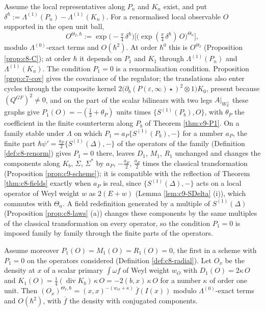 \begin{definition}
\label{def:c8-radial}
Assume the local representatives along $P_n$ and $K_n$ exist, and put $\delta^\hbar:=\Lambda^{(1)}(P_n)-\Lambda^{(1)}(K_n)$. For a renormalised local observable $O$ supported in the open unit ball,
\[
O^{\Theta_I,\hbar}:=\exp\big(-\tfrac\pi4\,\delta^\hbar\big)\Big[\big(\exp(\tfrac\pi4\,\delta^\hbar)\,O\big)^{\Theta_n}\Big],
\]
modulo $\Lambda^{(0)}$-exact terms and $O(\hbar^2)$. At order $\hbar^0$ this is $O^{\Theta_I}$ (Proposition \ref{prop:c8-C}); at order $\hbar$ it depends on $P_1$ and $K_1$ through $\Lambda^{(1)}(P_n)$ and $\Lambda^{(1)}(K_n)$. The condition $P_1=0$ is a renormalisation condition. Proposition \ref{prop:c7-cov} gives the covariance of the regulator; the translations also enter cycles through the composite kernel $2\big(\partial_b(P(\varepsilon,\infty)\star)^2\otimes1\big)K_0$, present because $(Q^{GF})^2\neq0$, and on the part of the scalar bilinears with two legs $A|_{W_{\mathbb R}^\perp}$ these graphs give $P_1(O)=-(\tfrac13+\theta_P)$ units times $\{S^{(1)}(P_b),O\}$, with $\theta_P$ the coefficient in the finite counterterm along $P_b$ of Theorem \ref{thm:c9-P1}. On a family stable under $\Lambda$ on which $P_1=a_P\{S^{(1)}(P_b),-\}$ for a number $a_P$, the finite part $\hbar\psi'=\tfrac{a_P}2\{S^{(1)}(\Delta),-\}$ of the operators of the family (Definition \ref{def:c8-renorm}) gives $P_1=0$ there, leaves $D_1$, $M_1$, $R_1$ unchanged and changes the components along $K_b$, $\Sigma$, $\Sigma^*$ by $a_P$, $-\tfrac{a_P}2$, $\tfrac{a_P}2$ times the classical transformation (Proposition \ref{prop:c9-scheme}); it is compatible with the reflection of Theorem \ref{thm:c8-fields} exactly when $a_P$ is real, since $\{S^{(1)}(\Delta),-\}$ acts on a local operator of Weyl weight $w$ as $2(E+w)$ (Lemma \ref{lem:c9-SDelta} (i)), which commutes with $\Theta_n$. A field redefinition generated by a multiple of $S^{(1)}(\Delta)$ (Proposition \ref{prop:c8-laws} (a)) changes these components by the same multiples of the classical transformation on every operator, so the condition $P_1=0$ is imposed family by family through the finite parts of the operators.
\end{definition}

\begin{proposition}
\label{prop:c8-primary}
Assume moreover $P_1(O)=M_1(O)=R_1(O)=0$, the first in a scheme with $P_1=0$ on the operators considered (Definition \ref{def:c8-radial}). Let $O_x$ be the density at $x$ of a scalar primary $\int\omega f$ of Weyl weight $w_O$ with $D_1(O)=2\kappa\,O$ and $K_1(O)=\tfrac14(\operatorname{div}K_b)\,\kappa\,O=-2(b,x)\,\kappa\,O$ for a number $\kappa$ of order one unit. Then $(O_x)^{\Theta_I,\hbar}=(x,x)^{-(w_O+\kappa)}\,\overline f(I(x))$ modulo $\Lambda^{(0)}$-exact terms and $O(\hbar^2)$, with $\overline f$ the density with conjugated components.
\end{proposition}

